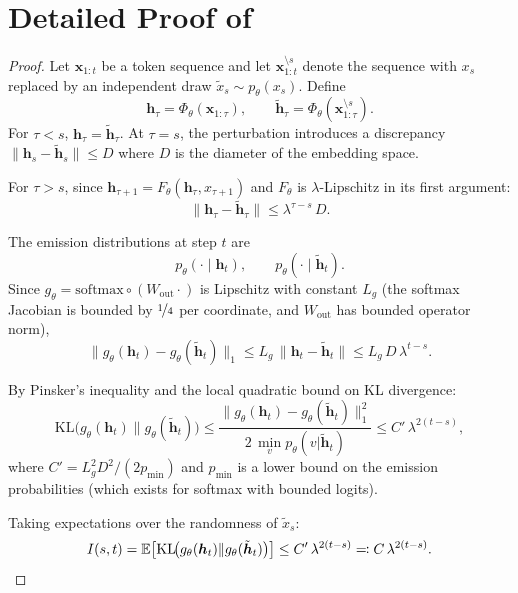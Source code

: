 \documentclass[11pt,a4paper]{article}
\theoremstyle{plain}
\theoremstyle{definition}
\theoremstyle{remark}
\newcommand{\E}{\mathbb{E}}
\newcommand{\KL}{\mathrm{KL}}
\newcommand{\softmax}{\mathrm{softmax}}
\begin{document}
\appendix

\section{Detailed Proof of }\label{app:decay_proof}

\begin{proof}
Let $\bm{x}_{1:t}$ be a token sequence and let $\bm{x}_{1:t}^{\setminus s}$
denote the sequence with $x_s$ replaced by an independent draw $\tilde{x}_s
\sim p_\theta(x_s)$. Define
\[
  \bm{h}_\tau = \Phi_\theta(\bm{x}_{1:\tau}), \qquad
  \tilde{\bm{h}}_\tau = \Phi_\theta(\bm{x}_{1:\tau}^{\setminus s}).
\]
For $\tau < s$, $\bm{h}_\tau = \tilde{\bm{h}}_\tau$. At $\tau = s$, the
perturbation introduces a discrepancy
$\|\bm{h}_s - \tilde{\bm{h}}_s\| \leq D$
where $D$ is the diameter of the embedding space.

For $\tau > s$, since $\bm{h}_{\tau+1} = F_\theta(\bm{h}_\tau, x_{\tau+1})$
and $F_\theta$ is $\lambda$-Lipschitz in its first argument:
\[
  \|\bm{h}_\tau - \tilde{\bm{h}}_\tau\| \leq \lambda^{\tau - s}\, D.
\]

The emission distributions at step $t$ are
\[
  p_\theta(\cdot \mid \bm{h}_t), \qquad
  p_\theta(\cdot \mid \tilde{\bm{h}}_t).
\]
Since $g_\theta = \softmax \circ (W_{\mathrm{out}} \cdot)$ is Lipschitz with
constant $L_g$ (the softmax Jacobian is bounded by $\nicefrac{1}{4}$ per
coordinate, and $W_{\mathrm{out}}$ has bounded operator norm),
\[
  \|g_\theta(\bm{h}_t) - g_\theta(\tilde{\bm{h}}_t)\|_1
  \leq L_g\, \|\bm{h}_t - \tilde{\bm{h}}_t\|
  \leq L_g\, D\, \lambda^{t-s}.
\]

By Pinsker's inequality and the local quadratic bound on KL divergence:
\[
  \KL\!\bigl(g_\theta(\bm{h}_t) \| g_\theta(\tilde{\bm{h}}_t)\bigr)
  \leq \frac{\|g_\theta(\bm{h}_t) - g_\theta(\tilde{\bm{h}}_t)\|_1^2}%
            {2\, \min_v p_\theta(v|\tilde{\bm{h}}_t)}
  \leq C'\, \lambda^{2(t-s)},
\]
where $C' = L_g^2 D^2 / (2 p_{\min})$ and $p_{\min}$ is a lower bound on
the emission probabilities (which exists for softmax with bounded logits).

Taking expectations over the randomness of $\tilde{x}_s$:
\[
  I(s,t) = \E\!\left[\KL\!\bigl(g_\theta(\bm{h}_t) \| g_\theta(\tilde{\bm{h}}_t)\bigr)\right]
  \leq C'\, \lambda^{2(t-s)} \eqqcolon C\, \lambda^{2(t-s)}.
  \qedhere
\]
\end{proof}
\end{document}
